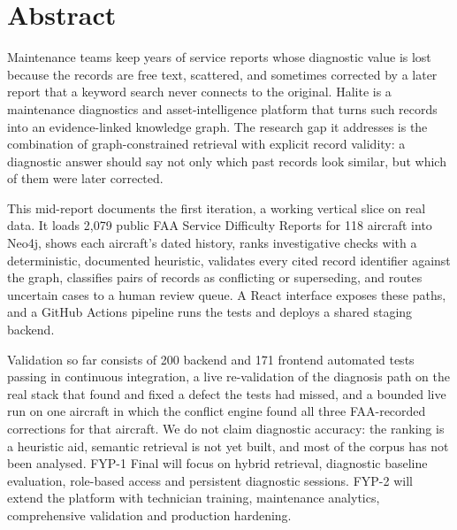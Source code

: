 \chapter*{Abstract}
Maintenance teams keep years of service reports whose diagnostic value is lost because the records are free text, scattered, and sometimes corrected by a later report that a keyword search never connects to the original. Halite is a maintenance diagnostics and asset-intelligence platform that turns such records into an evidence-linked knowledge graph. The research gap it addresses is the combination of graph-constrained retrieval with explicit record validity: a diagnostic answer should say not only which past records look similar, but which of them were later corrected.

This mid-report documents the first iteration, a working vertical slice on real data. It loads 2,079 public FAA Service Difficulty Reports for 118 aircraft into Neo4j, shows each aircraft's dated history, ranks investigative checks with a deterministic, documented heuristic, validates every cited record identifier against the graph, classifies pairs of records as conflicting or superseding, and routes uncertain cases to a human review queue. A React interface exposes these paths, and a GitHub Actions pipeline runs the tests and deploys a shared staging backend.

Validation so far consists of 200 backend and 171 frontend automated tests passing in continuous integration, a live re-validation of the diagnosis path on the real stack that found and fixed a defect the tests had missed, and a bounded live run on one aircraft in which the conflict engine found all three FAA-recorded corrections for that aircraft. We do not claim diagnostic accuracy: the ranking is a heuristic aid, semantic retrieval is not yet built, and most of the corpus has not been analysed. FYP-1 Final will focus on hybrid retrieval, diagnostic baseline evaluation, role-based access and persistent diagnostic sessions. FYP-2 will extend the platform with technician training, maintenance analytics, comprehensive validation and production hardening.
